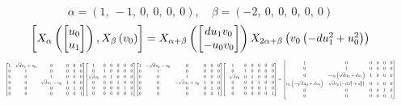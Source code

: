 \documentclass[11pt]{article}
\theoremstyle{definition}
\begin{document}
\[
\alpha = \left( 1, \  -1, \  0, \  0, \  0, \  0\right), \quad \beta = \left( -2, \  0, \  0, \  0, \  0, \  0\right)
\]
\[
\scaletoalign{\textwidth}{\left[ X_{\alpha}\left(\left[\begin{matrix}u_{0}\\u_{1}\end{matrix}\right]\right), X_{\beta}\left(v_{0}\right) \right] = X_{\alpha + \beta}\left(\left[\begin{matrix}d u_{1} v_{0}\\- u_{0} v_{0}\end{matrix}\right]\right) X_{2\alpha + \beta}\left(v_{0} \left(- d u_{1}^{2} + u_{0}^{2}\right)\right)}
\]
\[
\scaletoalign{\textwidth}{{\left[\begin{matrix}1 & \sqrt{d} u_{1} + u_{0} & 0 & 0 & 0 & 0\\0 & 1 & 0 & 0 & 0 & 0\\0 & 0 & 1 & 0 & 0 & 0\\0 & 0 & \sqrt{d} u_{1} - u_{0} & 1 & 0 & 0\\0 & 0 & 0 & 0 & 1 & 0\\0 & 0 & 0 & 0 & 0 & 1\end{matrix}\right]} {\left[\begin{matrix}1 & 0 & 0 & 0 & 0 & 0\\0 & 1 & 0 & 0 & 0 & 0\\\sqrt{d} v_{0} & 0 & 1 & 0 & 0 & 0\\0 & 0 & 0 & 1 & 0 & 0\\0 & 0 & 0 & 0 & 1 & 0\\0 & 0 & 0 & 0 & 0 & 1\end{matrix}\right]} {\left[\begin{matrix}1 & - \sqrt{d} u_{1} - u_{0} & 0 & 0 & 0 & 0\\0 & 1 & 0 & 0 & 0 & 0\\0 & 0 & 1 & 0 & 0 & 0\\0 & 0 & - \sqrt{d} u_{1} + u_{0} & 1 & 0 & 0\\0 & 0 & 0 & 0 & 1 & 0\\0 & 0 & 0 & 0 & 0 & 1\end{matrix}\right]} {\left[\begin{matrix}1 & 0 & 0 & 0 & 0 & 0\\0 & 1 & 0 & 0 & 0 & 0\\- \sqrt{d} v_{0} & 0 & 1 & 0 & 0 & 0\\0 & 0 & 0 & 1 & 0 & 0\\0 & 0 & 0 & 0 & 1 & 0\\0 & 0 & 0 & 0 & 0 & 1\end{matrix}\right]} = {\left[\begin{matrix}1 & 0 & 0 & 0 & 0 & 0\\0 & 1 & 0 & 0 & 0 & 0\\0 & - v_{0} \left(\sqrt{d} u_{0} + d u_{1}\right) & 1 & 0 & 0 & 0\\v_{0} \left(- \sqrt{d} u_{0} + d u_{1}\right) & \sqrt{d} v_{0} \left(- d u_{1}^{2} + u_{0}^{2}\right) & 0 & 1 & 0 & 0\\0 & 0 & 0 & 0 & 1 & 0\\0 & 0 & 0 & 0 & 0 & 1\end{matrix}\right]}}
\]
\end{document}
